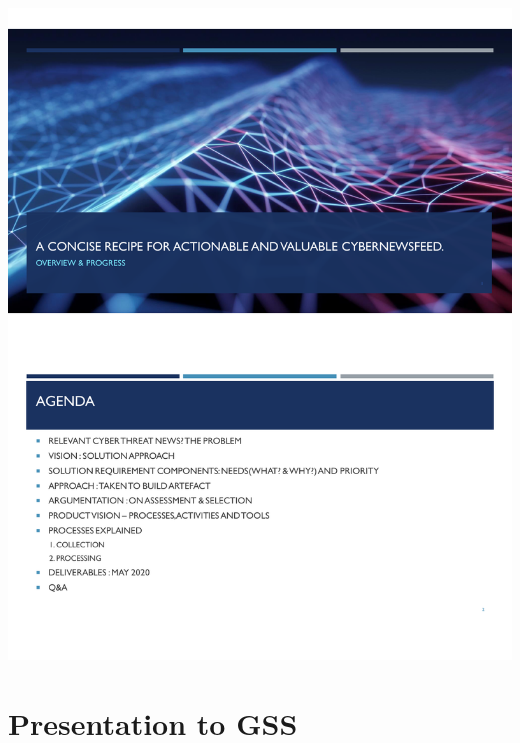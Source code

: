 \includegraphics[page=8,scale=0.75]{Appendices/Threat-Brief-Product-Jeroen-jean.pdf} 



\section{Presentation to GSS}\label{Presentation to GSS}

